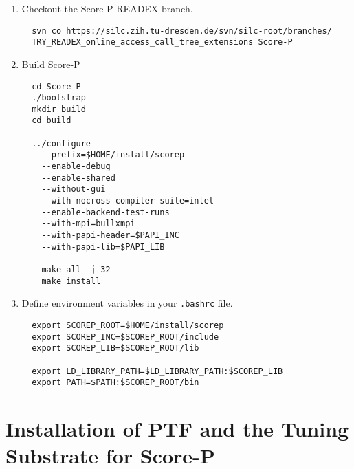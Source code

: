 \documentclass[12pt]{article}
\begin{document}
\begin{enumerate}
  \item Checkout the Score-P READEX branch.

  \begin{verbatim}
  svn co https://silc.zih.tu-dresden.de/svn/silc-root/branches/
  TRY_READEX_online_access_call_tree_extensions Score-P
  \end{verbatim}

  \item Build Score-P

  \begin{verbatim}
  cd Score-P
  ./bootstrap
  mkdir build
  cd build

  ../configure
    --prefix=$HOME/install/scorep
    --enable-debug
    --enable-shared
    --without-gui
    --with-nocross-compiler-suite=intel
    --enable-backend-test-runs
    --with-mpi=bullxmpi
    --with-papi-header=$PAPI_INC
    --with-papi-lib=$PAPI_LIB
    
    make all -j 32
    make install
  \end{verbatim}

  \item Define environment variables in your {\tt .bashrc} file.

  \begin{verbatim}
  export SCOREP_ROOT=$HOME/install/scorep
  export SCOREP_INC=$SCOREP_ROOT/include
  export SCOREP_LIB=$SCOREP_ROOT/lib

  export LD_LIBRARY_PATH=$LD_LIBRARY_PATH:$SCOREP_LIB
  export PATH=$PATH:$SCOREP_ROOT/bin
  \end{verbatim}

\end{enumerate}

\section{Installation of PTF and the Tuning Substrate for Score-P}
\end{document}
